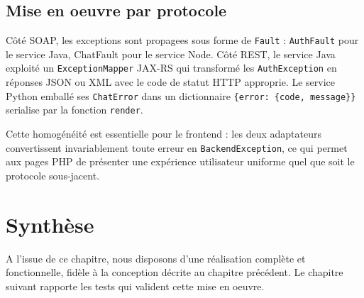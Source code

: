 \subsection{Mise en oeuvre par protocole}

Côté SOAP, les exceptions sont propagees sous forme de \texttt{Fault} : \texttt{AuthFault} pour le service Java, ChatFault pour le service Node. Côté REST, le service Java exploité un \texttt{ExceptionMapper} JAX-RS qui transformé les \texttt{AuthException} en réponses JSON ou XML avec le code de statut HTTP approprie. Le service Python emballé ses \texttt{ChatError} dans un dictionnaire \texttt{\{error: \{code, message\}\}} serialise par la fonction \texttt{render}.

Cette homogénéité est essentielle pour le frontend : les deux adaptateurs convertissent invariablement toute erreur en \texttt{BackendException}, ce qui permet aux pages PHP de présenter une expérience utilisateur uniforme quel que soit le protocole sous-jacent.

\section{Synthèse}

A l'issue de ce chapitre, nous disposons d'une réalisation complète et fonctionnelle, fidèle à la conception décrite au chapitre précédent. Le chapitre suivant rapporte les tests qui valident cette mise en oeuvre.
